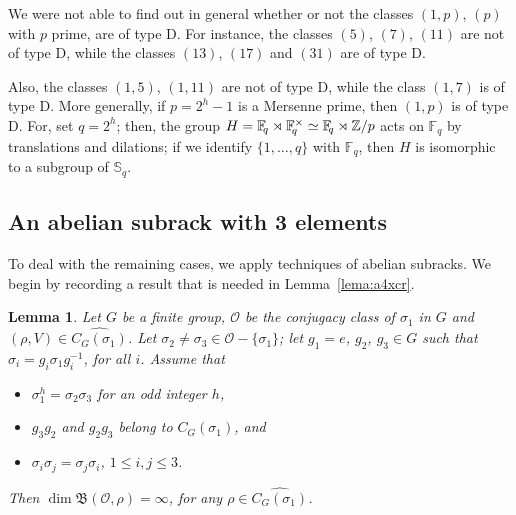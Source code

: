 \documentclass[11pt]{amsart} \textheight 22cm
\renewcommand{\^}[1]{\mbox{$^{\left( #1 \right)}$}}
\renewcommand{\_}[1]{\mbox{$_{\left( #1 \right)}$}}
\newcommand\toba{{\mathfrak B }}
\newcommand{\Z}{{\mathbb Z}}
\newcommand{\F}{{\mathbb F}}
\newcommand{\Oc}{{\mathcal O}}
\theoremstyle{plain}
\newtheorem{lema}{Lemma}[section]
\theoremstyle{definition}
\theoremstyle{remark}
\newcommand\s{\mathbb S}
\theoremstyle{remark}
\begin{document}
We were not able to find out in general whether or not the classes
$(1,p)$, $(p)$ with $p$ prime, are of type D. For instance, the
classes $(5)$, $(7)$, $(11)$ are not of type D, while the classes
$(13)$, $(17)$ and $(31)$ are of type D.

\medbreak Also, the classes $(1,5)$, $(1,11)$ are not of type D,
while the class $(1,7)$ is of type D. More generally, if $p = 2^h
- 1$ is a Mersenne prime, then $(1,p)$ is of type D. For, set
$q=2^h$; then, the group $H = \F_{\hspace{-2pt}q} \rtimes
\F_{\hspace{-2pt}q}^{\times}\simeq \F_{\hspace{-2pt}q} \rtimes \Z/p$ acts on $\F_q$ by
translations and dilations; if we identify $\{1, \dots, q\}$ with
$\F_q$, then $H$ is isomorphic to a subgroup of $\s_q$.



\medbreak\subsection{An abelian subrack with 3
elements}\label{subsection:triangulito} To deal with the remaining
cases, we apply techniques of abelian subracks. We begin by
recording a result that is needed in Lemma~\ref{lema:a4xcr}.
\begin{lema}\label{lem:triangulitos}
Let $G$ be a finite group, $\Oc$ be the conjugacy class of
$\sigma_1$ in $G$ and $(\rho,V) \in \widehat{C_{G}(\sigma_1)}$.
Let $\sigma_2 \neq\sigma_3\in\Oc - \{\sigma_1\}$; let $g_1 = e$,
$g_2$, $g_3\in G$ such that
$\sigma_{i}=g_{i}\sigma_{1}g_{i}^{-1}$, for all $i$. Assume that
\begin{itemize}
\item $\sigma_1^{h}=\sigma_2\sigma_3$ for an odd integer $h$,
\item $g_{3}g_{2}$ and $g_{2}g_{3}$ belong to $C_{G}(\sigma_1)$, and
\item  $\sigma_i\sigma_j=\sigma_j\sigma_i$, $1\leq i,j\leq 3$.
\end{itemize}

Then $\dim\toba(\Oc,\rho)=\infty$, for any
$\rho\in\widehat{C_{G}(\sigma_1)}$.
\end{lema}
\end{document}
